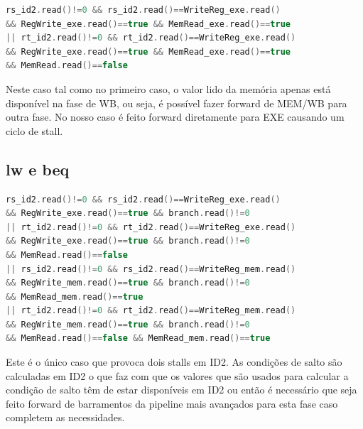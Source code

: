 \documentclass[pdftex,12pt,a4paper]{report}
\begin{document}
\begin{lstlisting}[language = c]
rs_id2.read()!=0 && rs_id2.read()==WriteReg_exe.read() 
&& RegWrite_exe.read()==true && MemRead_exe.read()==true
|| rt_id2.read()!=0 && rt_id2.read()==WriteReg_exe.read() 
&& RegWrite_exe.read()==true && MemRead_exe.read()==true 
&& MemRead.read()==false
\end{lstlisting}

Neste caso tal como no primeiro caso, o valor lido da memória apenas está disponível na fase de WB, ou seja, é possível fazer forward de MEM/WB para outra fase. No nosso caso é feito forward diretamente para EXE causando um ciclo de stall. 
\newpage
\subsection{lw e beq}
\begin{table}[!htb]
\centering
\label{my-label}
\end{table}

\begin{lstlisting}[language = c]
rs_id2.read()!=0 && rs_id2.read()==WriteReg_exe.read() 
&& RegWrite_exe.read()==true && branch.read()!=0
|| rt_id2.read()!=0 && rt_id2.read()==WriteReg_exe.read()
&& RegWrite_exe.read()==true && branch.read()!=0 
&& MemRead.read()==false
|| rs_id2.read()!=0 && rs_id2.read()==WriteReg_mem.read() 
&& RegWrite_mem.read()==true && branch.read()!=0 
&& MemRead_mem.read()==true
|| rt_id2.read()!=0 && rt_id2.read()==WriteReg_mem.read() 
&& RegWrite_mem.read()==true && branch.read()!=0 
&& MemRead.read()==false && MemRead_mem.read()==true

\end{lstlisting}

Este é o único caso que provoca dois stalls em ID2. As condições de salto são calculadas em ID2 o que faz com que os valores que são usados para calcular a condição de salto têm de estar disponíveis em ID2 ou então é necessário que seja feito forward de barramentos da pipeline mais avançados para esta fase caso completem as necessidades. 
\end{document}
